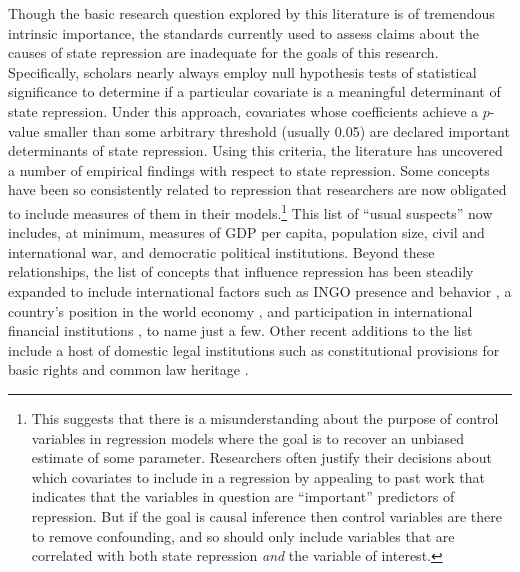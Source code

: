\documentclass[11pt]{article}
\begin{document}
Though the basic research question explored by this literature is of tremendous intrinsic importance, the standards currently used to assess claims about the causes of state repression are inadequate for the goals of this research. Specifically, scholars nearly always employ null hypothesis tests of statistical significance to determine if a particular covariate is a meaningful determinant of state repression. Under this approach, covariates whose coefficients achieve a $p$-value smaller than some arbitrary threshold (usually 0.05) are declared important determinants of state repression. Using this criteria, the literature has uncovered a number of empirical findings with respect to state repression. Some concepts have been so consistently related to repression that researchers are now obligated to include measures of them in their models.\footnote{This suggests that there is a misunderstanding about the purpose of control variables in regression models where the goal is to recover an unbiased estimate of some parameter. Researchers often justify their decisions about which covariates to include in a regression by appealing to past work that indicates that the variables in question are ``important'' predictors of repression. But if the goal is causal inference then control variables are there to remove confounding, and so should only include variables that are correlated with both state repression {\em and} the variable of interest.} This list of ``usual suspects'' now includes, at minimum, measures of GDP per capita, population size, civil and international war, and democratic political institutions. Beyond these relationships, the list of concepts that influence repression has been steadily expanded to include international factors such as INGO presence and behavior \citep{HafnerBurtonTsutsui2005, Franklin2008, MurdieDavis2012}, a country's position in the world economy \citep{HafnerBurton2005jpr}, and participation in international financial institutions \citep{AbouharbCingranelli2006, AbouharbCingranelli2007}, to name just a few. Other recent additions to the list include a host of domestic legal institutions such as constitutional provisions for basic rights \citep{Cross1999, KeithTatePoe2009} and common law heritage \citep{Mitchell2013}. 
\end{document}
